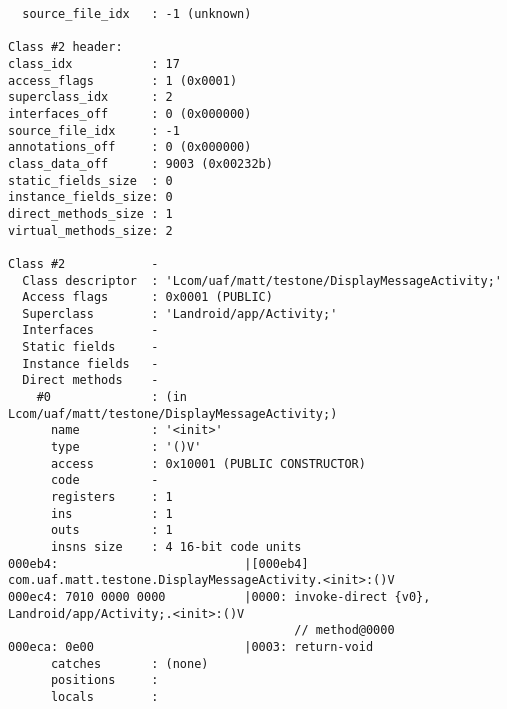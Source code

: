 \begin{lstlisting}
  source_file_idx   : -1 (unknown)

Class #2 header:
class_idx           : 17
access_flags        : 1 (0x0001)
superclass_idx      : 2
interfaces_off      : 0 (0x000000)
source_file_idx     : -1
annotations_off     : 0 (0x000000)
class_data_off      : 9003 (0x00232b)
static_fields_size  : 0
instance_fields_size: 0
direct_methods_size : 1
virtual_methods_size: 2

Class #2            -
  Class descriptor  : 'Lcom/uaf/matt/testone/DisplayMessageActivity;'
  Access flags      : 0x0001 (PUBLIC)
  Superclass        : 'Landroid/app/Activity;'
  Interfaces        -
  Static fields     -
  Instance fields   -
  Direct methods    -
    #0              : (in Lcom/uaf/matt/testone/DisplayMessageActivity;)
      name          : '<init>'
      type          : '()V'
      access        : 0x10001 (PUBLIC CONSTRUCTOR)
      code          -
      registers     : 1
      ins           : 1
      outs          : 1
      insns size    : 4 16-bit code units
000eb4:                          |[000eb4] com.uaf.matt.testone.DisplayMessageActivity.<init>:()V
000ec4: 7010 0000 0000           |0000: invoke-direct {v0}, Landroid/app/Activity;.<init>:()V
                                        // method@0000
000eca: 0e00                     |0003: return-void
      catches       : (none)
      positions     :
      locals        :


\end{lstlisting}

